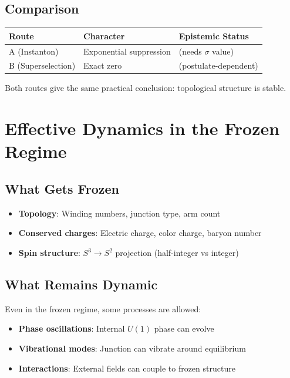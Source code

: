 \subsection{Comparison}

\begin{center}
\begin{tabular}{lll}
\toprule
\textbf{Route} & \textbf{Character} & \textbf{Epistemic Status} \\
\midrule
A (Instanton) & Exponential suppression & \tagDc{} (needs $\sigma$ value) \\
B (Superselection) & Exact zero & \tagP{} (postulate-dependent) \\
\bottomrule
\end{tabular}
\end{center}

Both routes give the same practical conclusion: topological structure is stable.

\section{Effective Dynamics in the Frozen Regime}
\label{sec:effective_dynamics}

\subsection{What Gets Frozen}

\begin{itemize}[nosep]
\item \textbf{Topology}: Winding numbers, junction type, arm count
\item \textbf{Conserved charges}: Electric charge, color charge, baryon number
\item \textbf{Spin structure}: $S^3 \to S^2$ projection (half-integer vs integer)
\end{itemize}

\subsection{What Remains Dynamic}

Even in the frozen regime, some processes are allowed:

\begin{itemize}[nosep]
\item \textbf{Phase oscillations}: Internal $U(1)$ phase can evolve
\item \textbf{Vibrational modes}: Junction can vibrate around equilibrium
\item \textbf{Interactions}: External fields can couple to frozen structure
\end{itemize}

